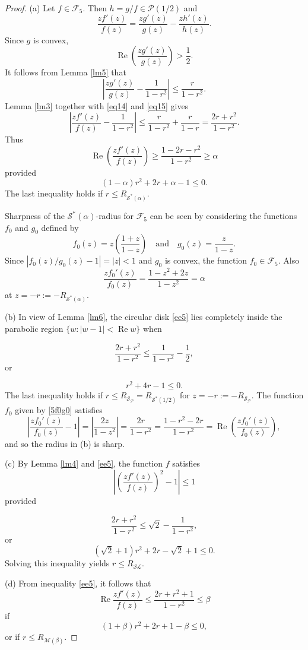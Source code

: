 \documentclass{amsart}
\begin{document}
\begin{proof}

(a) Let $f\in \mathcal{F}_5$.
 Then $h=g/f \in\mathcal{P}(1/2) $ and
\begin{equation}\label{eq14}
\frac{zf'(z)}{f(z)}=\frac{zg'(z)}{g(z)}-\frac{z h'(z)}{h(z)}.
\end{equation}
Since $g $ is convex, \[\operatorname{Re}\left(\frac{zg'(z)}{g(z)}\right)>\frac{1}{2}.\]
It follows from Lemma \ref{lm5} that
\begin{equation}\label{eq15}
\left|\frac{zg'(z)}{g(z)}-\frac{1}{1-r^2}\right|\leq\frac{r}{1-r^2}.
\end{equation}
Lemma \ref{lm3} together with \eqref{eq14} and \eqref{eq15} gives
\begin{equation}\label{ee5}
\left|\frac{zf'(z)}{f(z)}-\frac{1}{1-r^2}\right|\leq\frac{r}{1-r^2}+\frac{r}{1-r}=\frac{2r+r^2}{1-r^2}.
\end{equation}
Thus
\[\operatorname{Re}\left(\frac{zf'(z)}{f(z)} \right)\geq\frac{1-2r-r^2}{1-r^2}\geq\alpha \] provided
  \[(1-\alpha)r^2+2r+\alpha-1\leq0.\]
 The last inequality  holds if  $r\leq R_{\mathcal{S}^*(\alpha)}$.

Sharpness of the ${\mathcal{S}^*(\alpha)}$-radius for $\mathcal{F}_5$ can be seen by considering the functions $f_0$ and $g_0$ defined by
\begin{equation}\label{5f0g0}
f_0(z)=z\left(\frac{1+z}{1-z}\right) \quad \text{and} \quad g_0(z)=\frac{z}{1-z}.
\end{equation}
Since $\left| f_0(z)/g_0(z)-1\right|=|z|<1$  and $g_0$ is convex,  the function
$f_0\in\mathcal{F}_5 $. Also
\[ \frac{zf_0'(z)}{f_0(z)}= \frac{1-z^2+2z}{1-z^2}=\alpha\] at $z=-r:=-R_{\mathcal{S}^*(\alpha)}$.

(b) In view of Lemma \ref{lm6}, the  circular disk \eqref{ee5} lies completely  inside the parabolic region $\{w:|w-1|<\operatorname{Re} w\}$ when

 \[\frac{2r+r^2}{1-r^2}\leq\frac{1}{1-r^2}-\frac{1}{2},\]
 or
 
 \[r^2+4r-1\leq0.\]
The last inequality   holds if  $r\leq R_{\mathcal{S}_{\mathcal{P}}}=R_{\mathcal{S}^*{( 1/2 )}}$ for $z=-r:=-R_{\mathcal{S}_{\mathcal{P}}}.$
The function $f_0$ given by \eqref{5f0g0} satisfies
\[\left|\frac{zf_0'(z)}{f_0(z)}-1\right|=\left|\frac{2z}{1-z^2}\right|=\frac{2r}{1-r^2}=\frac{1-r^2-2r}{1-r^2}=\operatorname{Re}\left(\frac{zf_0'(z)}{f_0(z)}\right),\]
and so the radius in (b) is sharp.

(c) By Lemma \ref{lm4} and \eqref{ee5}, the function $f$ satisfies
 \[ \left|\left(\frac{zf'(z)}{f(z)}\right)^2-1\right|\leq 1  \] provided
 
\[\frac{2r+r^2}{1-r^2}\leq\sqrt2-\frac{1}{1-r^2}, \]
or
\[(\sqrt2+1)r^2+2r-\sqrt2+1\leq0.\]
Solving this inequality yields  $r \leq R_{\mathcal{SL}}.$

(d) From inequality \eqref{ee5}, it follows that
\[\operatorname{Re}\frac{zf'(z)}{f(z)}\leq\frac{2r+r^2+1}{1-r^2}\leq\beta\]
if
\[(1+\beta)r^2+2r+1-\beta\leq0,\]
or if $r\leq R_{\mathcal{M}(\beta)}.$
\end{proof}
\end{document}
